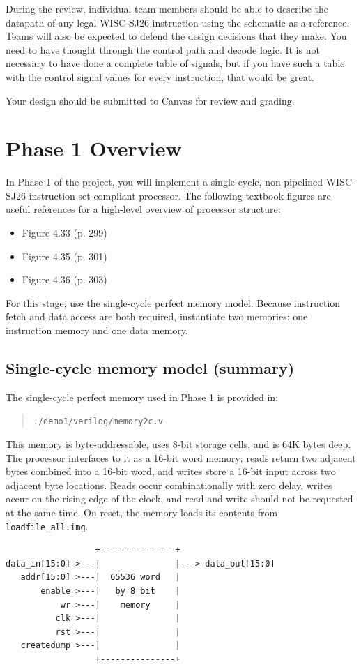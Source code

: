 \documentclass[12pt]{article}
\begin{document}
During the review, individual team members should be able to describe the datapath of any legal WISC-SJ26 instruction using the schematic as a reference. Teams will also be expected to defend the design decisions that they make. You need to have thought through the control path and decode logic. It is not necessary to have done a complete table of signals, but if you have such a table with the control signal values for every instruction, that would be great.

Your design should be submitted to Canvas for review and grading.

\section*{Phase 1 Overview}
In Phase 1 of the project, you will implement a single-cycle, non-pipelined WISC-SJ26 instruction-set-compliant processor. The following textbook figures are useful references for a high-level overview of processor structure:
\begin{itemize}
\item Figure 4.33 (p. 299)
\item Figure 4.35 (p. 301)
\item Figure 4.36 (p. 303)
\end{itemize}

For this stage, use the single-cycle perfect memory model. Because instruction fetch and data access are both required, instantiate two memories: one instruction memory and one data memory.

\subsection*{Single-cycle memory model (summary)}
The single-cycle perfect memory used in Phase 1 is provided in:
\begin{quote}
\texttt{./demo1/verilog/memory2c.v}
\end{quote}

This memory is byte-addressable, uses 8-bit storage cells, and is 64K bytes deep. The processor interfaces to it as a 16-bit word memory: reads return two adjacent bytes combined into a 16-bit word, and writes store a 16-bit input across two adjacent byte locations. Reads occur combinationally with zero delay, writes occur on the rising edge of the clock, and read and write should not be requested at the same time. On reset, the memory loads its contents from \texttt{loadfile\_all.img}.

\begin{center}
\begin{minipage}{0.92\textwidth}
\begin{verbatim}
                  +---------------+
data_in[15:0] >---|               |---> data_out[15:0]
   addr[15:0] >---|  65536 word   |
       enable >---|   by 8 bit    |
           wr >---|    memory     |
          clk >---|               |
          rst >---|               |
   createdump >---|               |
                  +---------------+
\end{verbatim}
\end{minipage}
\end{center}
\end{document}
